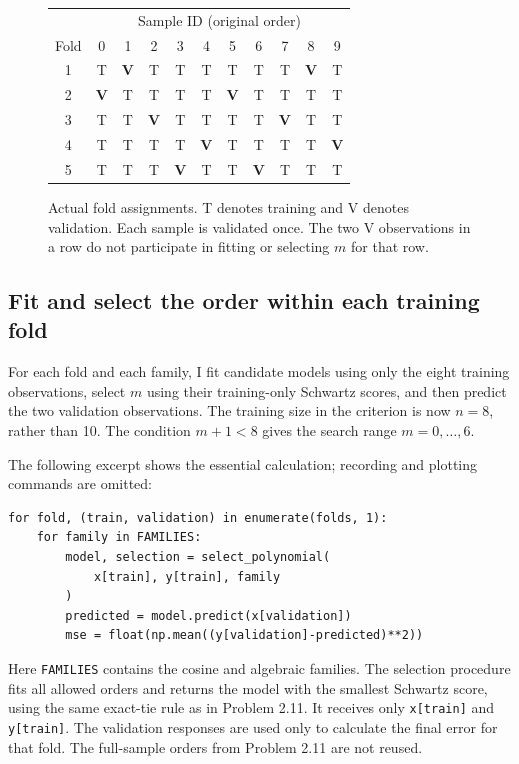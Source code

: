 \documentclass[11pt,a4paper]{article}
\newcommand{\train}{\cellcolor{pale}T}
\newcommand{\val}{\cellcolor{valid}\textbf{V}}
\begin{document}
\begin{figure}[htbp]\centering\small
\setlength{\tabcolsep}{8pt}
\begin{tabular}{c|*{10}{c}}
 &\multicolumn{10}{c}{Sample ID (original order)}\\
Fold&0&1&2&3&4&5&6&7&8&9\\\hline
1&\train&\val&\train&\train&\train&\train&\train&\train&\val&\train\\
2&\val&\train&\train&\train&\train&\val&\train&\train&\train&\train\\
3&\train&\train&\val&\train&\train&\train&\train&\val&\train&\train\\
4&\train&\train&\train&\train&\val&\train&\train&\train&\train&\val\\
5&\train&\train&\train&\val&\train&\train&\val&\train&\train&\train\\
\end{tabular}
\caption{Actual fold assignments. T denotes training and V denotes validation. Each sample is validated once. The two V observations in a row do not participate in fitting or selecting $m$ for that row.}
\end{figure}

\subsection*{Fit and select the order within each training fold}
For each fold and each family, I fit candidate models using only the eight training observations, select $m$ using their training-only Schwartz scores, and then predict the two validation observations. The training size in the criterion is now $n=8$, rather than 10. The condition $m+1<8$ gives the search range $m=0,\ldots,6$.

The following excerpt shows the essential calculation; recording and plotting commands are omitted:
\par\addvspace{4pt}
\noindent\begin{minipage}{\linewidth}
\begin{lstlisting}[style=pythoncode,caption={Selecting the order inside each training fold before predicting validation responses.}]
for fold, (train, validation) in enumerate(folds, 1):
    for family in FAMILIES:
        model, selection = select_polynomial(
            x[train], y[train], family
        )
        predicted = model.predict(x[validation])
        mse = float(np.mean((y[validation]-predicted)**2))
\end{lstlisting}
\end{minipage}\par\addvspace{4pt}
Here \texttt{FAMILIES} contains the cosine and algebraic families. The selection procedure fits all allowed orders and returns the model with the smallest Schwartz score, using the same exact-tie rule as in Problem 2.11. It receives only \texttt{x[train]} and \texttt{y[train]}. The validation responses are used only to calculate the final error for that fold. The full-sample orders from Problem 2.11 are not reused.
\end{document}
